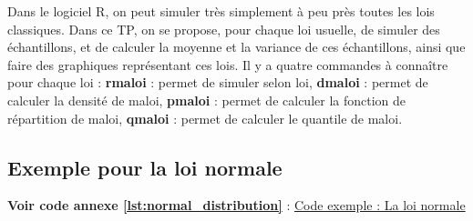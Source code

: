 
Dans le logiciel R, on peut simuler très simplement à peu près toutes les lois classiques. Dans ce TP, on se propose, pour chaque loi usuelle, de simuler des échantillons, et de calculer la moyenne et la variance de ces échantillons, ainsi que faire des graphiques représentant ces lois. Il y a quatre commandes à connaître pour chaque loi : \textbf{rmaloi} : permet de simuler selon loi, \textbf{dmaloi} : permet de calculer la densité de maloi, \textbf{pmaloi} : permet de calculer la fonction de répartition de maloi, \textbf{qmaloi} : permet de calculer le quantile de maloi.


\subsection{Exemple pour la loi normale}

  \textbf{Voir code annexe \ref{lst:normal_distribution}} : \hyperlink{\ref{lst:normal_distribution}}{Code exemple : La loi normale}

